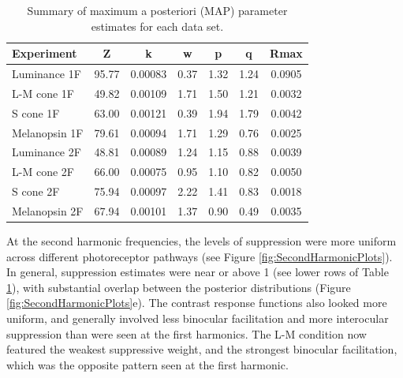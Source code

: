 \documentclass[
]{article}
\begin{document}
\begin{table}[H]

\caption{\label{tab:paramtable}Summary of maximum a posteriori (MAP) parameter estimates for each data set.}
\centering
\begin{tabular}[t]{lcccccc}
\toprule
Experiment & Z & k & w & p & q & Rmax\\
\midrule
Luminance 1F & 95.77 & 0.00083 & 0.37 & 1.32 & 1.24 & 0.0905\\
L-M cone 1F & 49.82 & 0.00109 & 1.71 & 1.50 & 1.21 & 0.0032\\
S cone 1F & 63.00 & 0.00121 & 0.39 & 1.94 & 1.79 & 0.0042\\
Melanopsin 1F & 79.61 & 0.00094 & 1.71 & 1.29 & 0.76 & 0.0025\\
\midrule
Luminance 2F & 48.81 & 0.00089 & 1.24 & 1.15 & 0.88 & 0.0039\\
L-M cone 2F & 66.00 & 0.00075 & 0.95 & 1.10 & 0.82 & 0.0050\\
S cone 2F & 75.94 & 0.00097 & 2.22 & 1.41 & 0.83 & 0.0018\\
Melanopsin 2F & 67.94 & 0.00101 & 1.37 & 0.90 & 0.49 & 0.0035\\
\bottomrule
\end{tabular}
\end{table}

At the second harmonic frequencies, the levels of suppression were more uniform across different photoreceptor pathways (see Figure \ref{fig:SecondHarmonicPlots}). In general, suppression estimates were near or above 1 (see lower rows of Table \ref{tab:paramtable}), with substantial overlap between the posterior distributions (Figure \ref{fig:SecondHarmonicPlots}e). The contrast response functions also looked more uniform, and generally involved less binocular facilitation and more interocular suppression than were seen at the first harmonics. The L-M condition now featured the weakest suppressive weight, and the strongest binocular facilitation, which was the opposite pattern seen at the first harmonic.
\end{document}

